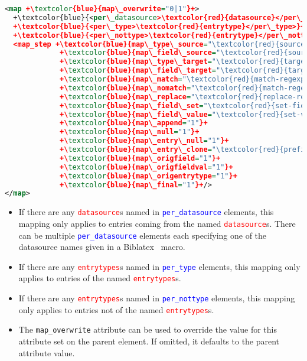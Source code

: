 \documentclass{ltxdockit}
\newcommand*{\biblatex}{Biblatex\xspace}
\begin{document}
\begin{lstlisting}[language=xml,escapechar=+,mathescape=true]
<map +\textcolor{blue}{map\_overwrite="0|1"}+>
  +\textcolor{blue}{<per\_datasource>\textcolor{red}{datasource}</per\_datasource>}+
  +\textcolor{blue}{<per\_type>\textcolor{red}{entrytype}</per\_type>}+
  +\textcolor{blue}{<per\_nottype>\textcolor{red}{entrytype}</per\_nottype>}+
  <map_step +\textcolor{blue}{map\_type\_source="\textcolor{red}{source-entrytype}"}+
             +\textcolor{blue}{map\_field\_source="\textcolor{red}{source-field}"}+
             +\textcolor{blue}{map\_type\_target="\textcolor{red}{target-entrytype}"}+
             +\textcolor{blue}{map\_field\_target="\textcolor{red}{target-field}"}+
             +\textcolor{blue}{map\_match="\textcolor{red}{match-regexp}"}+
             +\textcolor{blue}{map\_nomatch="\textcolor{red}{match-regexp}"}+
             +\textcolor{blue}{map\_replace="\textcolor{red}{replace-regexp}"}+
             +\textcolor{blue}{map\_field\_set="\textcolor{red}{set-field}"}+
             +\textcolor{blue}{map\_field\_value="\textcolor{red}{set-value}"}+
             +\textcolor{blue}{map\_append="1"}+
             +\textcolor{blue}{map\_null="1"}+
             +\textcolor{blue}{map\_entry\_null="1"}+
             +\textcolor{blue}{map\_entry\_clone="\textcolor{red}{prefix}"}+
             +\textcolor{blue}{map\_origfield="1"}+
             +\textcolor{blue}{map\_origfieldval="1"}+
             +\textcolor{blue}{map\_origentrytype="1"}+
             +\textcolor{blue}{map\_final="1"}+/>
</map>
\end{lstlisting}%

\begin{itemize}
\item If there are any \textcolor{red}{\texttt{datasource}}s named in
  \textcolor{blue}{\texttt{per\_datasource}} elements, this mapping only applies to entries
  coming from the named \textcolor{red}{\texttt{datasource}}s. There can be
  multiple \textcolor{blue}{\texttt{per\_datasource}} elements each specifying one of the
  datasource names given in a \biblatex\ \verb++ macro.
\item If there are any \textcolor{red}{\texttt{entrytypes}}s named in
  \textcolor{blue}{\texttt{per\_type}} elements, this mapping only applies to entries
  of the named \textcolor{red}{\texttt{entrytypes}}s.
\item If there are any \textcolor{red}{\texttt{entrytypes}}s named in
  \textcolor{blue}{\texttt{per\_nottype}} elements, this mapping only applies to entries
  not of the named \textcolor{red}{\texttt{entrytypes}}s.
\item The \texttt{map\_overwrite} attribute can be used to override the
  value for this attribute set on the parent  element. If
  omitted, it defaults to the parent  attribute value.
\end{itemize}
\end{document}

